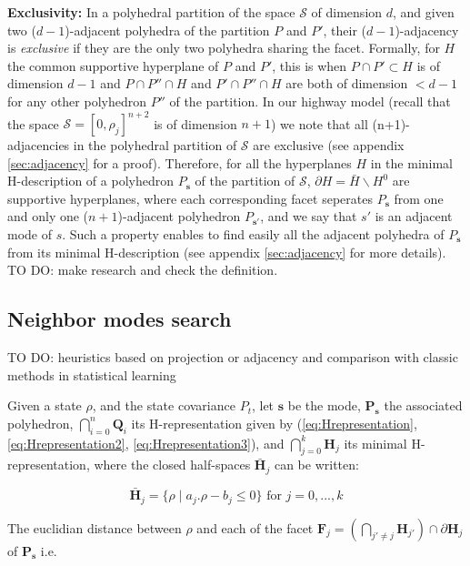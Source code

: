 \documentclass[11pt]{article}
\numberwithin{equation}{section}
\numberwithin{figure}{section}
\numberwithin{table}{section}
\begin{document}
\noindent \textbf{Exclusivity: } In a polyhedral partition of the space $\mathcal{S}$ of dimension $d$, and given two ($d-1$)-adjacent polyhedra of the partition $P$ and $P'$, their ($d-1$)-adjacency is \textit{exclusive} if they are the only two polyhedra sharing the facet. Formally, for $H$ the common supportive hyperplane of $P$ and $P'$, this is when $P\cap P'\subset H$ is of dimension $d-1$ and $P\cap P''\cap H$ and $P'\cap P''\cap H$ are both of dimension $<d-1$ for any other polyhedron $P''$ of the partition. In our highway model (recall that the space $\mathcal{S} = [0,\rho_{j}]^{n+2}$ is of dimension $n+1$) we note that all (n+1)-adjacencies in the polyhedral partition of $\mathcal{S}$ are exclusive (see appendix \ref{sec:adjacency} for a proof). Therefore, for all the hyperplanes $H$ in the minimal H-description of a polyhedron $P_{\boldsymbol s}$ of the partition of $\mathcal{S}$, $\partial H=\bar{H}\backslash H^{0}$ are supportive hyperplanes, where each corresponding facet seperates $P_{\boldsymbol s}$ from one and only one ($n+1$)-adjacent polyhedron $P_{\boldsymbol s'}$, and we say that $s'$ is an adjacent mode of $s$. Such a property enables to find easily all the adjacent polyhedra of $P_{\boldsymbol s}$ from its minimal H-description (see appendix \ref{sec:adjacency} for more details). TO DO: make research and check the definition.


\subsection{Neighbor modes search}

TO DO: heuristics based on projection or adjacency and comparison with classic methods in statistical learning 

Given a state $\rho$, and the state covariance $P_{t}$, let $\boldsymbol s$ be the mode, $\textbf{P}_{\boldsymbol s}$ the associated polyhedron, $\bigcap_{i=0}^{n} \textbf{Q}_{i}$ its H-representation given by (\ref{eq:Hrepresentation}, \ref{eq:Hrepresentation2}, \ref{eq:Hrepresentation3}), and $\bigcap_{j=0}^{k} \textbf{H}_{j}$ its minimal H-representation, where the closed half-spaces $\bar{\textbf{H}}_{j}$ can be written:

\begin{equation}
\bar{\textbf{H}}_{j} = \{\rho \mid a_{j}.\rho-b_{j} \leq 0\} \text{ for }j=0,...,k
\label{eq:halfSpace}
\end{equation}

\noindent The euclidian distance between $\rho$ and each of the facet $\textbf{F}_{j}=(\bigcap_{j'\neq j}\textbf{H}_{j'})\cap\partial\textbf{H}_{j}$ of $\textbf{P}_{\boldsymbol s}$ i.e.
\end{document}
